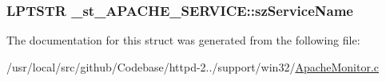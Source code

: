 \subsubsection[{\texorpdfstring{sz\+Service\+Name}{szServiceName}}]{\setlength{\rightskip}{0pt plus 5cm}L\+P\+T\+S\+TR \+\_\+st\+\_\+\+A\+P\+A\+C\+H\+E\+\_\+\+S\+E\+R\+V\+I\+C\+E\+::sz\+Service\+Name}\hypertarget{struct__st__APACHE__SERVICE_a756538030779a2025623fc3c912b3f91}{}\label{struct__st__APACHE__SERVICE_a756538030779a2025623fc3c912b3f91}


The documentation for this struct was generated from the following file\+:\begin{DoxyCompactItemize}
\item 
/usr/local/src/github/\+Codebase/httpd-\/2../support/win32/\hyperlink{ApacheMonitor_8c}{Apache\+Monitor.\+c}\end{DoxyCompactItemize}
